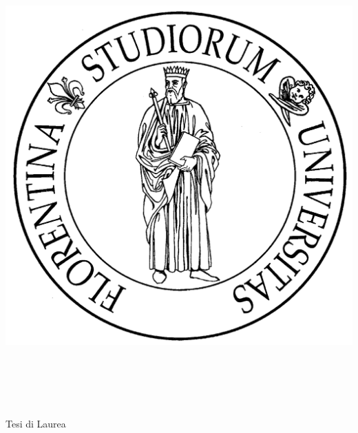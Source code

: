 \begin{titlepage}
	\begin{center}
	\includegraphics[scale=.050]{logo/unifi}\\
	\vspace{5mm}
	\begin{calligra} {\LARGE \myUni} \end{calligra} \\
	\begin{normalsize}\vspace{2mm}\textsc{\myFaculty}\end{normalsize} \\
	\begin{small}\textsc{\myDegree}\end{small} \\
	\vspace*{\fill}
	Tesi di Laurea \\
	\vspace{5mm}
	\Large{\color{Maroon}\spacedallcaps{\myTitle}} \\

\end{center}
\end{titlepage}
